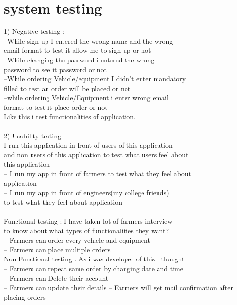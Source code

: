 \documentclass[conference]{IEEEtran}
\begin{document}
\section{system testing}
1) Negative testing : \\
--While sign up I entered the wrong name and the wrong \\
email format to test it allow me to sign up  or not \\
--While changing the password i entered the wrong \\
password to see it password or not\\
--While ordering Vehicle/equipment I didn't enter mandatory \\
filled to test an order will be placed or not\\
--while ordering Vehicle/Equipment i enter wrong email\\
format to test it place order or not\\
Like this i test functionalities of application.\\
\\
2) Usability testing\\
I run this application in front of users of this application\\
and non users of this application to test what users feel about\\
this application\\
-- I run my app in front of farmers to test what they feel about\\
application\\
-- I run my app in front of engineers(my college friends) \\
to test what they feel about application\\
\\
Functional testing : I have taken lot of farmers interview \\
to know about what types of functionalities they want?\\
-- Farmers can order every vehicle and equipment\\ 
-- Farmers can place multiple orders\\
Non Functional testing : As i was developer of this i thought\\
-- Farmers can repeat same order by changing date and time\\
-- Farmers can Delete their account\\
-- Farmers can update their details
-- Farmers will get mail confirmation after placing orders\\
\end{document}
